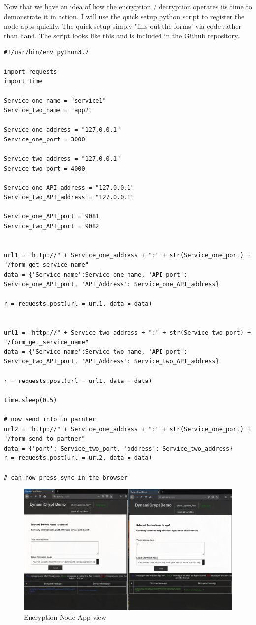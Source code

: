 Now that we have an idea of how the encryption / decryption operates its time to demonstrate it in action.
I will use the quick setup python script to register the node apps quickly. The quick setup simply "fills out the forms" via code rather than hand. The script looks like this and is included in the Github repository.
\begin{lstlisting}
#!/usr/bin/env python3.7

import requests
import time

Service_one_name = "service1"
Service_two_name = "app2"

Service_one_address = "127.0.0.1"
Service_one_port = 3000

Service_two_address = "127.0.0.1"
Service_two_port = 4000

Service_one_API_address = "127.0.0.1"
Service_two_API_address = "127.0.0.1"

Service_one_API_port = 9081
Service_two_API_port = 9082


url1 = "http://" + Service_one_address + ":" + str(Service_one_port) + "/form_get_service_name"
data = {'Service_name':Service_one_name, 'API_port': Service_one_API_port, 'API_Address': Service_one_API_address} 

r = requests.post(url = url1, data = data) 


url1 = "http://" + Service_two_address + ":" + str(Service_two_port) + "/form_get_service_name"
data = {'Service_name':Service_two_name, 'API_port': Service_two_API_port, 'API_Address': Service_two_API_address} 

r = requests.post(url = url1, data = data) 

time.sleep(0.5)

# now send info to parnter
url2 = "http://" + Service_one_address + ":" + str(Service_one_port) + "/form_send_to_partner"
data = {'port': Service_two_port, 'address': Service_two_address} 
r = requests.post(url = url2, data = data) 

# can now press sync in the browser
\end{lstlisting}

\begin{figure}[!h]
  \centering
      \includegraphics[width=1\textwidth]{Figures/b13.png}
  \caption[Encryption Node App view]{Encryption Node App view}
  \label{fig:b13}
\end{figure}
\FloatBarrier

